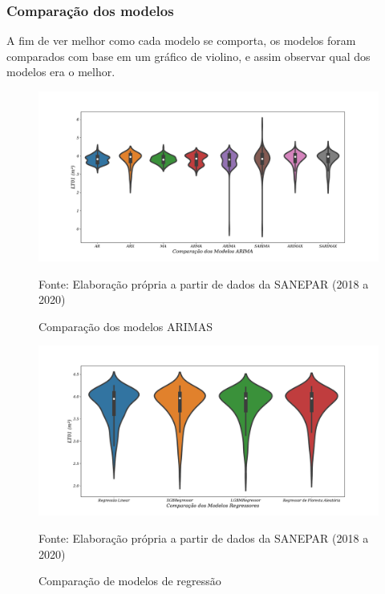 \subsubsection{Compara\c c\~ao dos modelos}

A fim de ver melhor como cada modelo se comporta, os modelos foram comparados com base em um gráfico de violino, e assim observar qual dos modelos era o melhor.


\begin{figure}[H]
	\centering
	\caption{Comparação dos modelos ARIMAS}
	\includegraphics[width=0.9\linewidth]{Resultados/Figuras/modelos-arima}
	
	\label{fig:modelos-arima}
	
	Fonte: Elaboração própria a partir de dados da SANEPAR (2018 a 2020)
\end{figure}


\begin{figure}[H]
	\centering
	\caption{Comparação de modelos de regressão }
	\includegraphics[width=0.9\linewidth]{Resultados/Figuras/violin-LR-XGB-LGBM-RF}
	
	\label{fig:violin-lr-xgb-lgbm-rf}
	
	Fonte: Elaboração própria a partir de dados da SANEPAR (2018 a 2020)
\end{figure}

